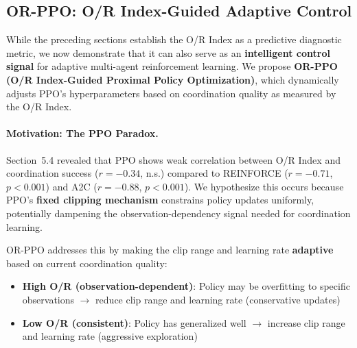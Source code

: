 %
%

\subsection{OR-PPO: O/R Index-Guided Adaptive Control}
\label{sec:or_ppo_full}

While the preceding sections establish the O/R Index as a predictive diagnostic metric, we now demonstrate that it can also serve as an \textbf{intelligent control signal} for adaptive multi-agent reinforcement learning. We propose \textbf{OR-PPO (O/R Index-Guided Proximal Policy Optimization)}, which dynamically adjusts PPO's hyperparameters based on coordination quality as measured by the O/R Index.

\paragraph{Motivation: The PPO Paradox.}

Section~5.4 revealed that PPO shows weak correlation between O/R Index and coordination success ($r = -0.34$, n.s.) compared to REINFORCE ($r = -0.71$, $p < 0.001$) and A2C ($r = -0.88$, $p < 0.001$). We hypothesize this occurs because PPO's \textbf{fixed clipping mechanism} constrains policy updates uniformly, potentially dampening the observation-dependency signal needed for coordination learning.

OR-PPO addresses this by making the clip range and learning rate \textbf{adaptive} based on current coordination quality:
\begin{itemize}
    \item \textbf{High O/R (observation-dependent)}: Policy may be overfitting to specific observations $\to$ reduce clip range and learning rate (conservative updates)
    \item \textbf{Low O/R (consistent)}: Policy has generalized well $\to$ increase clip range and learning rate (aggressive exploration)
\end{itemize}

